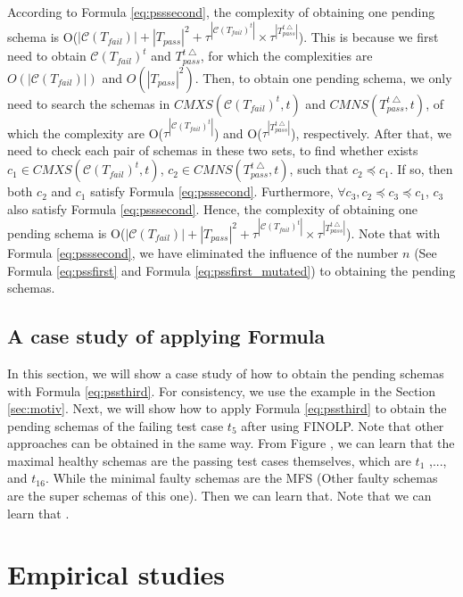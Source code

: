 {According to Formula \ref{eq:psssecond}, the complexity of obtaining one pending schema is O($|\mathcal{C}(T_{fail})| + |T_{pass}|^{2} + \tau^{|\mathcal{C}(T_{fail})^{t}|} \times \tau^{|T_{pass}^{t\bigtriangleup}|}$). This is because we first need to obtain $\mathcal{C}(T_{fail})^{t}$ and $T_{pass}^{t\bigtriangleup}$, for which the complexities are $O(|\mathcal{C}(T_{fail})|)$ and $O(|T_{pass}|^{2})$. Then, to obtain one pending schema, we only need to search the schemas in $CMXS(\mathcal{C}(T_{fail})^{t}, t)$ and $CMNS(T_{pass}^{t\bigtriangleup}, t)$, of which the complexity are O($\tau^{|\mathcal{C}(T_{fail})^{t}|}$) and O($\tau^{|T_{pass}^{t\bigtriangleup}|}$), respectively. After that, we need to check each pair of schemas in these two sets, to find whether exists $c_{1} \in CMXS(\mathcal{C}(T_{fail})^{t}, t)$, $c_{2} \in CMNS(T_{pass}^{t\bigtriangleup}, t)$, such that $c_{2} \preceq c_{1}$. If so, then both $c_{2}$ and $c_{1}$ satisfy Formula \ref{eq:psssecond}. Furthermore, $\forall c_{3}, c_{2} \preceq c_{3} \preceq c_{1}$, $c_{3}$ also satisfy Formula \ref{eq:psssecond}. Hence, the complexity of obtaining one pending schema is O($|\mathcal{C}(T_{fail})| + |T_{pass}|^{2} + \tau^{|\mathcal{C}(T_{fail})^{t}|} \times \tau^{|T_{pass}^{t\bigtriangleup}|}$). Note that with Formula \ref{eq:psssecond}, we have eliminated the influence of the number $n$ (See Formula \ref{eq:pssfirst} and Formula \ref{eq:pssfirst_mutated}) to obtaining the pending schemas.

\subsection{A case study of applying Formula }
In this section, we will show a case study of how to obtain the pending schemas with Formula \ref{eq:pssthird}. For consistency, we use the example in the Section \ref{sec:motiv}. Next, we will show how to  apply Formula \ref{eq:pssthird} to obtain the pending schemas of the failing test case $t_{5}$ after using FINOLP. Note that other approaches can be obtained in the same way.
From Figure , we can learn that the maximal healthy schemas are the passing test cases themselves, which are $t_{1}$ ,..., and $t_{16}$. While the minimal faulty schemas are the MFS  (Other faulty schemas are the super schemas of this one).
Then we can learn that.  Note that we can learn that .



\section{Empirical studies}\label{sec:emp}


}
